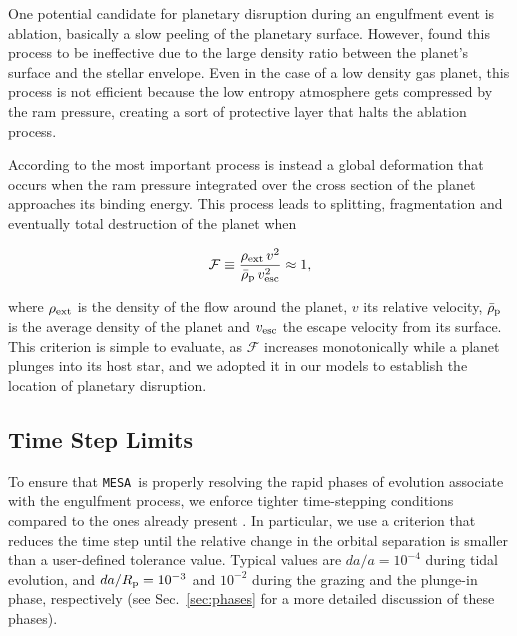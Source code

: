 \documentclass[twocolumn]{aastex62}
\newcommand{\code}[1]{\texttt{#1}}
\newcommand{\mesa}{\code{MESA}}
\newcommand{\MESA}{\mesa}
\newcommand\beq{\begin{equation}}
\newcommand\eeq{\end{equation}}
\begin{document}

One potential candidate for planetary disruption during an engulfment event is ablation, basically a slow peeling of the planetary surface. However, \citet{Jia_2018} found this process to be ineffective due to the large density ratio between the planet's surface and the stellar envelope. Even in the case of a low density gas planet, this process is not efficient because the low entropy atmosphere gets compressed by the ram pressure, creating a sort of protective layer that halts the ablation process. 

According to \citet{Jia_2018} the most important process is instead a global deformation that occurs when the ram pressure integrated over the cross section of the planet approaches its binding energy. This process leads to splitting, fragmentation and eventually total destruction of the planet when 

\beq  \mathcal{F} \equiv \frac{\rho_{\rm ext} \, v^2}{\bar{\rho}_{\rm p} \, v^2_{\rm esc}} \approx 1, \label{eq:jia}\eeq

where $\rho_{\rm ext}$ is the density of the flow around the planet, $v$ its relative velocity, $\bar{\rho}_{\rm p}$ is the average density of the planet and $v_{\rm esc}$ the escape velocity from its surface. 
This criterion is simple to evaluate, as $\mathcal{F}$ increases monotonically while a planet plunges into its host star, and we adopted it in our models to establish the location of planetary disruption. 

\subsection{Time Step Limits}\label{sec:time_steps}
To ensure that \MESA\ is properly resolving the rapid phases of evolution associate with the engulfment process, we enforce tighter time-stepping conditions compared to the ones already present \citep{Paxton:2011}. In particular, we use a criterion that reduces the time step until the relative change in the orbital separation is smaller than a user-defined tolerance value. Typical values are $da/a = 10^{-4}$ during  tidal evolution, 
and $da/R_{\rm p} = 10^{-3}$ and $10^{-2}$ during the grazing and the plunge-in phase, respectively (see Sec.~\ref{sec:phases} for a more detailed discussion of these phases). 
\end{document}
